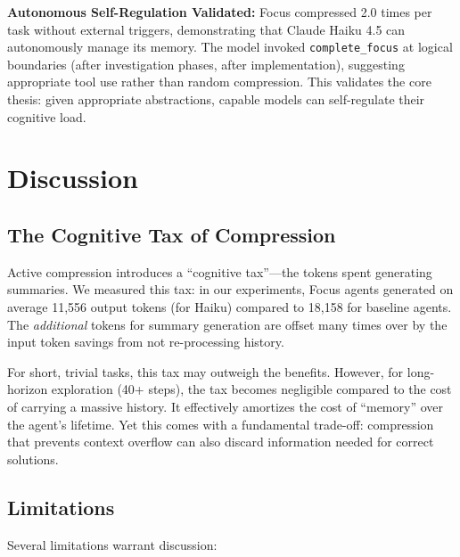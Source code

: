 \documentclass[conference]{IEEEtran}
\begin{document}
\textbf{Autonomous Self-Regulation Validated:} Focus compressed 2.0 times per task without external triggers, demonstrating that Claude Haiku 4.5 can autonomously manage its memory. The model invoked \texttt{complete\_focus} at logical boundaries (after investigation phases, after implementation), suggesting appropriate tool use rather than random compression. This validates the core thesis: given appropriate abstractions, capable models can self-regulate their cognitive load.



\section{Discussion}
\subsection{The Cognitive Tax of Compression}
Active compression introduces a ``cognitive tax''---the tokens spent generating summaries. We measured this tax: in our experiments, Focus agents generated on average 11,556 output tokens (for Haiku) compared to 18,158 for baseline agents. The \textit{additional} tokens for summary generation are offset many times over by the input token savings from not re-processing history.

For short, trivial tasks, this tax may outweigh the benefits. However, for long-horizon exploration (40+ steps), the tax becomes negligible compared to the cost of carrying a massive history. It effectively amortizes the cost of ``memory'' over the agent's lifetime. Yet this comes with a fundamental trade-off: compression that prevents context overflow can also discard information needed for correct solutions.

\subsection{Limitations}
Several limitations warrant discussion:
\end{document}
